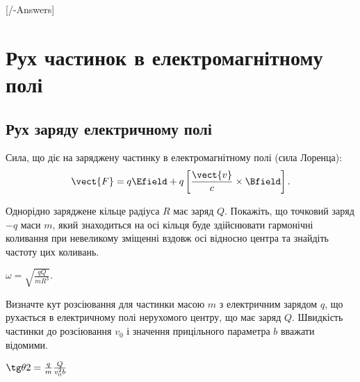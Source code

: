 
[\currfilebase/\currfilebase-Answers]
\chapter{Рух частинок в електромагнітному полі}\label{\currfilebase}

\section{Рух заряду електричному полі}

\begin{Theory}\small
Сила, що діє на заряджену частинку в електромагнітному полі (сила Лоренца):
	\begin{equation}
		\vect{F} = q\Efield + q\left[ \frac{\vect{v}}{c} \times \Bfield\right].
	\end{equation}
\end{Theory}

\begin{problem}
Однорідно заряджене кільце радіуса $R$ має заряд $Q$. Покажіть, що точковий заряд $-q$ маси $m$, який знаходиться на осі кільця буде здійснювати гармонічні коливання при невеликому зміщенні вздовж осі відносно центра та знайдіть частоту цих коливань.
\begin{solution}
	$\omega = \sqrt{\frac{qQ}{mR^3}}$.
\end{solution}
\end{problem}

\begin{problem}
    Визначте кут розсіювання для частинки масою $m$ з електричним зарядом $q$, що рухається в електричному полі нерухомого центру, що має заряд $Q$. Швидкість частинки до розсіювання $v_0$ і значення прицільного
    параметра $b$ вважати відомими.
\begin{solution}
	$\tg\theta2 = \frac qm\frac{Q}{v_0^2b}$
\end{solution}
\end{problem}

